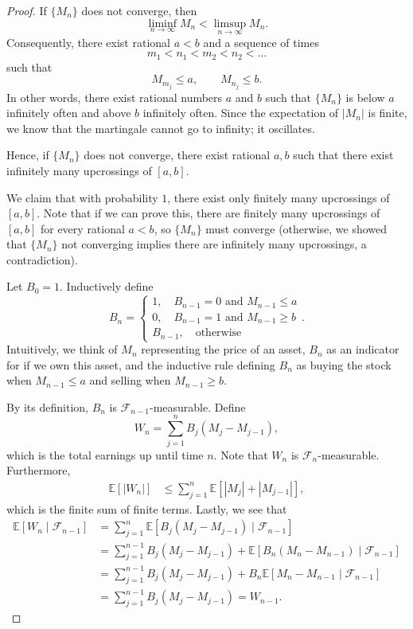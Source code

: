 \documentclass{tufte-handout}
\newcommand*\E{\mathbb{E}}
\theoremstyle{definition}
\begin{document}
\begin{proof}
	If $\{M_n\}$ does not converge, then \[
		\liminf\limits_{n \to \infty} M_n < \limsup\limits_{n \to \infty} M_n
	.\] Consequently, there exist rational $a < b$ and a sequence of times \[
		m_1 < n_1 < m_2 < n_2 <\ldots
	\] such that \[
		M_{m_j} \le a, \qquad M_{n_j} \le b
	.\] In other words, there exist rational numbers $a$ and $b$ such that $\{M_n\}$ is below $a$ infinitely often and above $b$ infinitely often. Since the expectation of $\left| M_n \right|$ is finite, we know that the martingale cannot go to infinity; it oscillates.

	Hence, if $\{M_n\}$ does not converge, there exist rational $a,b$ such that there exist infinitely many upcrossings of $[a,b]$.

	We claim that with probability $1$, there exist only finitely many upcrossings of $[a,b]$. Note that if we can prove this, there are finitely many upcrossings of $[a,b]$ for every rational $a<b$, so $\{M_n\}$ must converge (otherwise, we showed that $\{M_n\}$ not converging implies there are infinitely many upcrossings, a contradiction).

	Let $B_0 = 1$. Inductively define \[
		B_n = \begin{cases}
			1, \quad B_{n-1} = 0 \text{ and } M_{n-1} \le a \\
			0, \quad B_{n-1} = 1 \text{ and } M_{n-1} \ge b \\
			B_{n-1}, \quad \text{otherwise}
		\end{cases}
	.\] Intuitively, we think of $M_n$ representing the price of an asset, $B_n$ as an indicator for if we own this asset, and the inductive rule defining $B_n$ as buying the stock when $M_{n-1} \le a$ and selling when $M_{n-1} \ge b$.

	By its definition, $B_n$ is $\mathscr{F}_{n-1}$-measurable. Define \[
		W_n = \sum\limits_{j=1}^{n} B_j (M_j - M_{j-1})
	,\] which is the total earnings up until time $n$. 
	Note that $W_n$ is $\mathscr{F}_n$-measurable. Furthermore,
	\begin{align*}
		\E\left[\left| W_n \right|\right] &\le \sum\limits_{j=1}^{n} \E\left[\left| M_j \right| + \left| M_{j-1} \right|\right]
	,\end{align*} which is the finite sum of finite terms.
	Lastly, we see that
	\begin{align*}
		\E\left[W_n \mid \mathscr{F}_{n-1}\right] &= \sum\limits_{j=1}^{n} \E\left[B_j(M_j - M_{j-1}) \mid \mathscr{F}_{n-1}\right]  \\
		&= \sum\limits_{j=1}^{n-1} B_j \left( M_j - M_{j-1} \right) + \E\left[B_n\left( M_n - M_{n-1} \right)\mid \mathscr{F}_{n-1}\right]  \\
		&= \sum\limits_{j=1}^{n-1} B_{j}\left( M_j - M_{j-1} \right) + B_n \E\left[M_n - M_{n-1} \mid \mathscr{F}_{n-1}\right] \\
		&= \sum\limits_{j=1}^{n-1} B_{j}\left( M_j - M_{j-1} \right) = W_{n-1}
	.\end{align*}


\end{proof}
\end{document}
